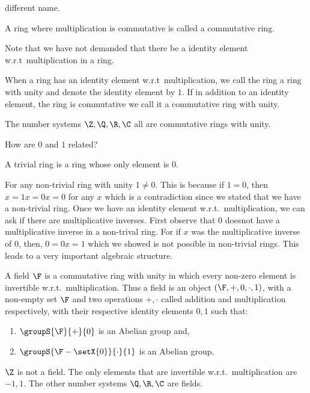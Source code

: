 different name.
\begin{Definition}[name=Commutative ring]
    A ring where multiplication is commutative is called a commutative ring.
\end{Definition}
Note that we have not demanded that there be a identity element w.r.t~multiplication in a ring. 
\begin{Definition}[name=Ring with unity]
    When a ring has an identity element w.r.t~multiplication, we call the ring a ring with unity and denote
    the identity element by $1$. If in addition to an identity element, the ring is commutative we call it a
    commutative ring with unity.
\end{Definition}
\begin{Example}
    The number systems $\Z,\Q,\R,\C$ all are commutative rings with unity.
\end{Example}
How are $0$ and $1$ related? 
\begin{Definition}
    A trivial ring is a ring whose only element is $0$.
\end{Definition}
For any non-trivial ring with unity $1\neq 0$. This is because if $1 = 0$, then $x = 1x = 0x = 0$ for any $x$
which is a contradiction since we stated that we have a non-trivial ring.
Once we have an identity element w.r.t.~multiplication, we can ask if there are multiplicative inverses. First
observe that $0$ doesnot have a multiplicative inverse in a non-trival ring. For if $x$ was the multiplicative
inverse of $0$, then, $0 = 0x = 1$ which we showed is not possible in non-trivial rings. This leads to a very
important algebraic structure.
\begin{Definition}[name=Field]
    A field $\F$ is a commutative ring with unity in which every non-zero element is invertible
    w.r.t.~multiplication. Thus a field is an object $\left(\F,+,0,\cdot,1\right)$, with a non-empty set $\F$
    and two operations $+,\cdot$ called addition and multiplication respectively, with their respective
    identity elements $0,1$ such that:
    \begin{enumerate}
	\item
	    $\groupS{\F}{+}{0}$ is an Abelian group and,
	\item
	    $\groupS{\F-\setX{0}}{\cdot}{1}$ is an Abelian group.
    \end{enumerate}
\end{Definition}
\begin{Example}
    $\Z$ is not a field. The only elements that are invertible w.r.t.~multiplication are $-1,1$. The other
    number systems $\Q,\R,\C$ are fields.
\end{Example}

